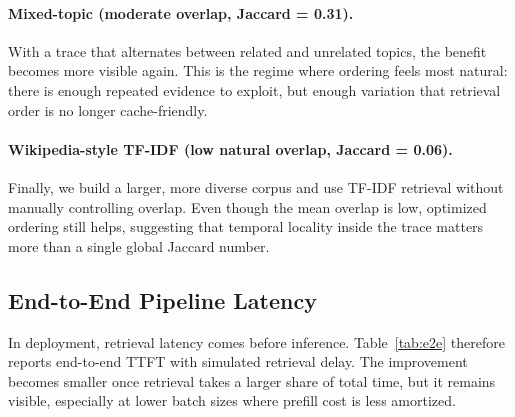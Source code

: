 \documentclass{article}
\begin{document}
\paragraph{Mixed-topic (moderate overlap, Jaccard = 0.31).}
With a trace that alternates between related and unrelated topics, the benefit becomes more visible again. This is the regime where ordering feels most natural: there is enough repeated evidence to exploit, but enough variation that retrieval order is no longer cache-friendly.

\paragraph{Wikipedia-style TF-IDF (low natural overlap, Jaccard = 0.06).}
\label{sec:real_corpus}
Finally, we build a larger, more diverse corpus and use TF-IDF retrieval without manually controlling overlap. Even though the mean overlap is low, optimized ordering still helps, suggesting that temporal locality inside the trace matters more than a single global Jaccard number.

\begin{table}[t]
\caption{Wikipedia-style corpus evaluation with TF-IDF retrieval (RTX 4090, 200 queries, 1{,}000 constructed passages / 20 topics; mean Jaccard = 0.06, no controlled overlap).}
\label{tab:real_corpus}
\centering
\small
{}
\vspace{-0.5em}
\end{table}


\subsection{End-to-End Pipeline Latency}
\label{sec:e2e}

In deployment, retrieval latency comes before inference. Table~\ref{tab:e2e} therefore reports end-to-end TTFT with simulated retrieval delay. The improvement becomes smaller once retrieval takes a larger share of total time, but it remains visible, especially at lower batch sizes where prefill cost is less amortized.
\end{document}
